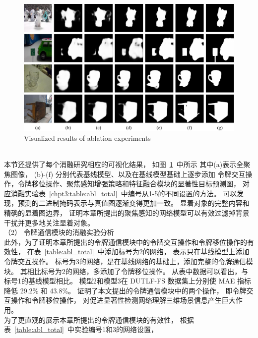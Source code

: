 %
%
\begin{figure}[t] 
	\includegraphics[width=0.99\linewidth]{figures/chapter3/self-comparsion-Use} 
	\centering
	{Visualized results of ablation experiments}
	\label{figure:self_comp}
\end{figure}
\\
%
%
%
%
\indent
本节还提供了每个消融研究相应的可视化结果，
如图~\ref{figure:self_comp}~中所示
其中(a)表示全聚焦图像，
(b)-(f) 分别代表基线模型、以及在基线模型基础上逐步添加
令牌交互操作，令牌移位操作、聚焦感知增强策略和特征融合模块的显著性目标预测图，
对应消融实验表~\ref{chpt3:table:abl_total}~中编号从1-5的不同设置的方法。
可以发现，预测的二进制掩码表示与真值图逐渐变得更加一致。 
显着对象的完整内容和精确的显着图边界，
证明本章所提出的聚焦感知的网络模型可以有效过滤掉背景干扰并更多地关注显着对象。 
\\
%
%
%
%
\indent
（2）
令牌通信模块的消融实验分析
\\
%
%
%
%
\indent
此外，为了证明本章所提出的令牌通信模块中的令牌交互操作和令牌移位操作的有效性，
在表~\ref{table:abl_total}~中添加标号为2的网络，
表示只在基线模型上添加令牌交互操作。
标号为3的网络，是在基线网络的基础上，添加完整的令牌通信模块。
其相比标号为2的网络，多添加了令牌移位操作。
从表中数据可以看出，与标号1的基线模型相比。
模型2和模型3在 DUTLF-FS 数据集上分别使 MAE 指标降低 29.2\% 和 43.8\%。 
证明了本文提出的令牌通信模块中的两个操作，
即令牌交互操作和令牌移位操作，
对促进显著性检测网络理解三维场景信息产生巨大作用。
\\
%
%
%
%
\indent
为了更直观的展示本章所提出的令牌通信模块的有效性，
根据表~\ref{table:abl_total}~中实验编号1和3的网络设置，

